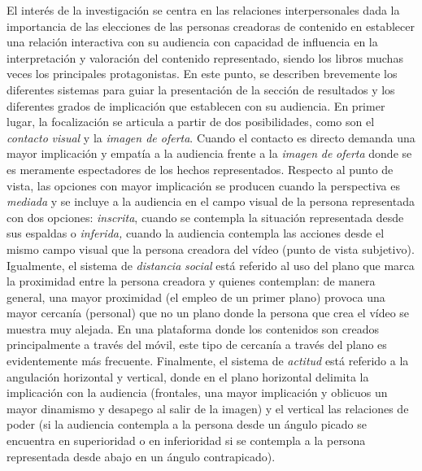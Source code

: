 El interés de la investigación se centra en las relaciones
interpersonales dada la importancia de las elecciones de las personas
creadoras de contenido en establecer una relación interactiva con su
audiencia con capacidad de influencia en la interpretación y valoración
del contenido representado, siendo los libros muchas veces los
principales protagonistas. En este punto, se describen brevemente los
diferentes sistemas para guiar la presentación de la sección de
resultados y los diferentes grados de implicación que establecen con su
audiencia. En primer lugar, la focalización se articula a partir de dos
posibilidades, como son el \emph{contacto} \emph{visual} y la
\emph{imagen de oferta}. Cuando el contacto es directo demanda una mayor
implicación y empatía a la audiencia frente a la \emph{imagen} \emph{de}
\emph{oferta} donde se es meramente espectadores de los hechos
representados. Respecto al punto de vista, las opciones con mayor
implicación se producen cuando la perspectiva es \emph{mediada} y se
incluye a la audiencia en el campo visual de la persona representada con
dos opciones: \emph{inscrita}, cuando se contempla la situación
representada desde sus espaldas o \emph{inferida,} cuando la audiencia
contempla las acciones desde el mismo campo visual que la persona
creadora del vídeo (punto de vista subjetivo). Igualmente, el sistema de
\emph{distancia} \emph{social} está referido al uso del plano que marca
la proximidad entre la persona creadora y quienes contemplan: de manera
general, una mayor proximidad (el empleo de un primer plano) provoca una
mayor cercanía (personal) que no un plano donde la persona que crea el
vídeo se muestra muy alejada. En una plataforma donde los contenidos son
creados principalmente a través del móvil, este tipo de cercanía a
través del plano es evidentemente más frecuente. Finalmente, el sistema
de \emph{actitud} está referido a la angulación horizontal y vertical,
donde en el plano horizontal delimita la implicación con la audiencia
(frontales, una mayor implicación y oblicuos un mayor dinamismo y
desapego al salir de la imagen) y el vertical las relaciones de poder
(si la audiencia contempla a la persona desde un ángulo picado se
encuentra en superioridad o en inferioridad si se contempla a la persona
representada desde abajo en un ángulo contrapicado).
